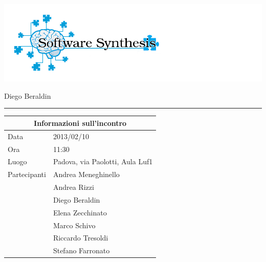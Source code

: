 \documentclass[a4paper,10pt,openright]{article}
\begin{document}
\includegraphics[width=1.5\textwidth]{logo}

\begin{center}

\begin{Large}
\hspace{1.2cm}{Verbale d'incontro 2013/02/10}
\newline
\end{Large}

\begin{small}
	Diego Beraldin
\end{small}

\noindent\rule{\textwidth}{0.4pt}
\newline

\begin{tabular}{ll}
\toprule
\multicolumn{2}{c}{\sffamily Informazioni sull'incontro}\\
\midrule
Data & 2013/02/10 \\
Ora & 11:30 \\
Luogo & Padova, via Paolotti, Aula Luf1 \\
Partecipanti & Andrea Meneghinello \\ & Andrea Rizzi \\& Diego Beraldin \\& Elena Zecchinato\\   & Marco Schivo \\ & Riccardo Tresoldi \\ & Stefano Farronato \\
\bottomrule
\end{tabular}

\end{center}
\end{document}
